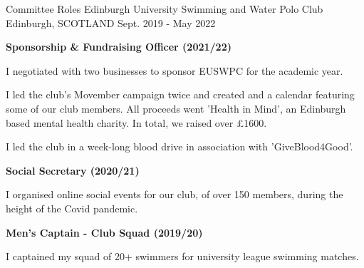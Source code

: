 \begin{cventries}
  \cventry
    {Committee Roles} %
    {Edinburgh University Swimming and Water Polo Club} %
    {Edinburgh, SCOTLAND} %
    {Sept. 2019 - May 2022} %
    {
      \textbf{Sponsorship \& Fundraising Officer (2021/22)}
      \vspace{1.35em}
      \begin{cvitems} %
        \item I negotiated with two businesses to sponsor EUSWPC for the academic year.
        \item I led the club's Movember campaign twice and created and a calendar featuring some of our club members. All proceeds went 'Health in Mind', an Edinburgh based mental health charity. In total, we raised over £1600.
        \item I led the club in a week-long blood drive in association with 'GiveBlood4Good'.
      \end{cvitems}
      \vspace{1.35em}
      \textbf{Social Secretary (2020/21)}
      \vspace{1.35em}
      \begin{cvitems}
        \item I organised online social events for our club, of over 150 members, during the height of the Covid pandemic.
      \end{cvitems}
      \vspace{1.35em}
      \textbf{Men's Captain - Club Squad (2019/20)}
      \vspace{1.35em}
      \begin{cvitems}
        \item I captained my squad of 20+ swimmers for university league swimming matches.
      \end{cvitems}
    }
\end{cventries}
